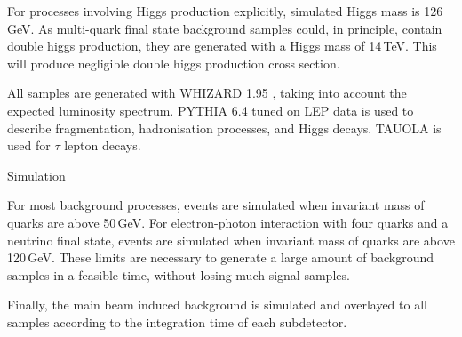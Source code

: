 For processes involving Higgs production explicitly, simulated Higgs mass is 126\,GeV.
As multi-quark final state background samples could, in principle, contain double higgs production, they are generated with a Higgs mass of 14\,TeV. This will produce negligible double higgs production cross section.






All samples are generated with WHIZARD 1.95 \cite{}, taking into account the expected \CLIC luminosity spectrum.
PYTHIA 6.4 \cite{} tuned on LEP data \cite{} is used to describe fragmentation, hadronisation processes, and Higgs decays. TAUOLA \cite{} is used for $\tau$ lepton decays.

Simulation

For most background processes, events are simulated when invariant mass of quarks are above 50\,GeV. For electron-photon interaction with four quarks and a neutrino final state, events are simulated when invariant mass of quarks are above 120\,GeV. These limits are necessary to generate a large amount of background samples in a feasible time, without losing much signal samples.

Finally, the main beam induced background \ggHad is simulated and overlayed \cite{} to all samples according to the integration time of each subdetector.

